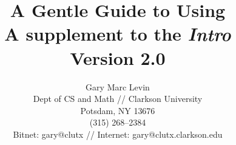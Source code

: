 \longpage
\raggedright
\newcommand{\Intro}{the {\em Intro\/}}
\newcommand{\GURU}{guru\marginpar[\hfill$\Rightarrow$]{$\Leftarrow$}}

	\title{ A Gentle Guide to Using \ISETL\\
		A supplement to \Intro\\
		Version 2.0
	}
	\author{Gary Marc Levin \\
	Dept of CS and Math // Clarkson University \\
	Potsdam, NY 13676\\
	(315) 268--2384\\
	Bitnet: gary@clutx // Internet: gary@clutx.clarkson.edu
	}

\maketitle






